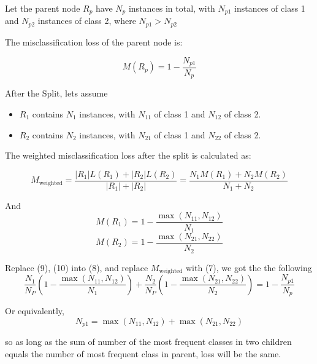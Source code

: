 \begin{answer}

Let the parent node $R_p$ have $N_p$ instances in total, with $N_{p1}$ instances of class 1 and $N_{p2}$ instances of class 2, where $N_{p1} > N_{p2}$

The misclassification loss of the parent node is:

\begin{equation}
    M(R_p) = 1 - \frac{N_{p1}}{N_p}
\end{equation}

After the Split, lets assume
\begin{itemize}
    \item \(R_1\) contains \(N_1\) instances, with \(N_{11}\) of class 1 and \(N_{12}\) of class 2.
    \item \(R_2\) contains \(N_2\) instances, with \(N_{21}\) of class 1 and \(N_{22}\) of class 2.
\end{itemize}

The weighted misclassification loss after the split is calculated as:

\begin{equation}
M_{\text{weighted}} = \frac{\lvert R_1 \rvert L(R_1) + \lvert R_2 \rvert L(R_2)}{\lvert R_1 \rvert + \lvert R_2 \rvert} = \frac{N_1 M(R_1) + N_2 M(R_2)}{N_1 + N_2} 
\end{equation}

And 
\begin{equation}
M(R_1) = 1 - \frac{\max(N_{11}, N_{12})}{N_1}
\end{equation}
\begin{equation}
M(R_2) = 1 - \frac{\max(N_{21}, N_{22})}{N_2}
\end{equation}

Replace (9), (10) into (8), and replace $M_{\text{weighted}}$ with (7), we got the the following 
\begin{equation}
\frac{N_1}{N_P}(1 - \frac{\max(N_{11}, N_{12})}{N_1}) + \frac{N_2}{N_P}(1 - \frac{\max(N_{21}, N_{22})}{N_2}) = 1 - \frac{N_{p1}}{N_p}
\end{equation}

Or equivalently, 
\begin{equation}
    N_{p1} = \max(N_{11}, N_{12}) + \max(N_{21}, N_{22})
\end{equation}

so as long as the sum of number of the most frequent classes in two children equals the number of most frequent class in parent, loss will be the same.
\end{answer}
